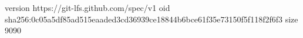 version https://git-lfs.github.com/spec/v1
oid sha256:0c05a5df85ad515eaaded3cd36939ce18844b6bce61f35e73150f5f118f2f6f3
size 9090
